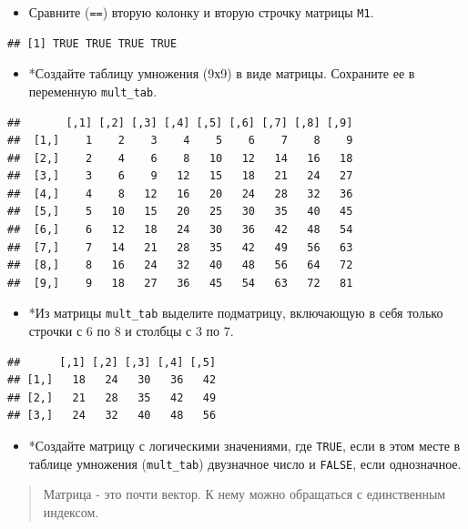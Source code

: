 \documentclass[]{book}
\providecommand{\tightlist}{%
  \setlength{\itemsep}{0pt}\setlength{\parskip}{0pt}}
\begin{document}
\begin{itemize}
\tightlist
\item
  Сравните (\texttt{==}) вторую колонку и вторую строчку матрицы
  \texttt{M1}.
\end{itemize}

\begin{verbatim}
## [1] TRUE TRUE TRUE TRUE
\end{verbatim}

\begin{itemize}
\tightlist
\item
  *Создайте таблицу умножения (9х9) в виде матрицы. Сохраните ее в
  переменную \texttt{mult\_tab}.
\end{itemize}

\begin{verbatim}
##       [,1] [,2] [,3] [,4] [,5] [,6] [,7] [,8] [,9]
##  [1,]    1    2    3    4    5    6    7    8    9
##  [2,]    2    4    6    8   10   12   14   16   18
##  [3,]    3    6    9   12   15   18   21   24   27
##  [4,]    4    8   12   16   20   24   28   32   36
##  [5,]    5   10   15   20   25   30   35   40   45
##  [6,]    6   12   18   24   30   36   42   48   54
##  [7,]    7   14   21   28   35   42   49   56   63
##  [8,]    8   16   24   32   40   48   56   64   72
##  [9,]    9   18   27   36   45   54   63   72   81
\end{verbatim}

\begin{itemize}
\tightlist
\item
  *Из матрицы \texttt{mult\_tab} выделите подматрицу, включающую в себя
  только строчки с 6 по 8 и столбцы с 3 по 7.
\end{itemize}

\begin{verbatim}
##      [,1] [,2] [,3] [,4] [,5]
## [1,]   18   24   30   36   42
## [2,]   21   28   35   42   49
## [3,]   24   32   40   48   56
\end{verbatim}

\begin{itemize}
\tightlist
\item
  *Создайте матрицу с логическими значениями, где \texttt{TRUE}, если в
  этом месте в таблице умножения (\texttt{mult\_tab}) двузначное число и
  \texttt{FALSE}, если однозначное.
\end{itemize}

\begin{quote}
Матрица - это почти вектор. К нему можно обращаться с единственным
индексом.
\end{quote}
\end{document}
